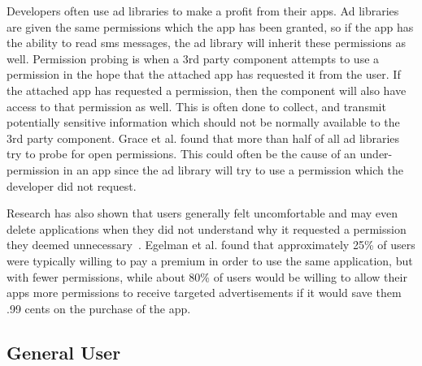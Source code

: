 \documentclass[journal,transmag]{IEEEtran}
\newcommand{\todo}[1]{\textcolor{cyan}{\textbf{[#1]}}}
\begin{document}
Developers often use ad libraries to make a profit from their apps. Ad libraries are given the same permissions which the app has been granted, so if the app has the ability to read sms messages, the ad library will inherit these permissions as well. Permission probing is when a 3rd party component attempts to use a permission in the hope that the attached app has requested it from the user. If the attached app has requested a permission, then the component will also have access to that permission as well. This is often done to collect, and transmit potentially sensitive information which should not be normally available to the 3rd party component. Grace et al.\cite{Grace:2012:UEA:2185448.2185464} found that more than half of all ad libraries try to probe for open permissions. This could often be the cause of an under-permission in an app since the ad library will try to use a permission which the developer did not request.

Research has also shown that users generally felt uncomfortable and may even delete applications when they did not understand why it requested a permission they deemed unnecessary~\cite{Lin:2012:EPU:2370216.2370290}. Egelman et al.\cite{Egelman12choicearchitecture} found that approximately 25\% of users were typically willing to pay a premium in order to use the same application, but with fewer permissions, while about 80\% of users would be willing to allow their apps more permissions to receive targeted advertisements if it would save them .99 cents on the purchase of the app.








%







\subsection{General User}
\end{document}
